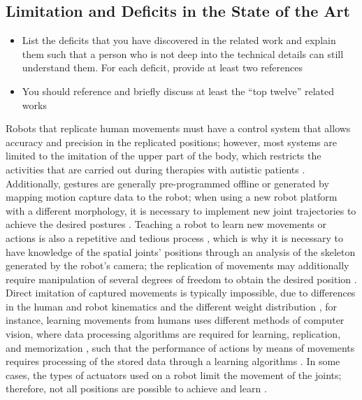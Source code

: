 \documentclass[thesis]{mas_proposal}
\begin{document}
	\subsection{Limitation and Deficits in the State of the Art}
	\begin{itemize}
		\item List the deficits that you have discovered in the related work and explain them such that a person who is not deep into the technical details can still understand them.
		For each deficit, provide at least two references
		\item You should reference and briefly discuss at least the ``top twelve'' related works
	\end{itemize}
	Robots that replicate human movements must have a control system that allows accuracy and precision in the replicated positions; however, most systems are limited to the imitation of the upper part of the body, which restricts the activities that are carried out during therapies with autistic patients \cite{Billard_2004}. Additionally, gestures are generally pre-programmed offline or generated by mapping motion capture data to the robot; when using a new robot platform with a different morphology, it is necessary to implement new joint trajectories to achieve the desired postures \cite{Van_de_Perre_2015}. Teaching a robot to learn new movements or actions is also a repetitive and tedious process \cite{Yan_Wu_2010}, which is why it is necessary to have knowledge of the spatial joints' positions through an analysis of the skeleton generated by the robot's camera; the replication of movements may additionally require manipulation of several degrees of freedom to obtain the desired position \cite{Fadli2018}. Direct imitation of captured movements is typically impossible, due to differences in the human and robot kinematics and the different weight distribution \cite{Koenemann_2012}, for instance, learning movements from humans uses different methods of computer vision, where data processing algorithms are required for learning, replication, and memorization \cite{Liu2015}, such that the performance of actions by means of movements requires processing of the stored data through a learning algorithms \cite{Kober_2010}. In some cases, the types of actuators used on a robot limit the movement of the joints; therefore, not all positions are possible to achieve and learn \cite{Almalki2020}.
	
\end{document}
